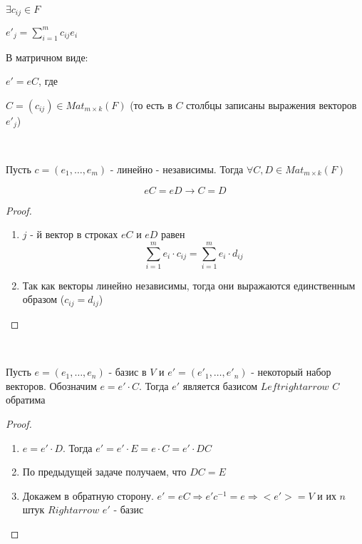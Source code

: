 $\exists c_{ij} \in F$

$e'_j = \sum_{i = 1}^mc_{ij}e_i$

В матричном виде:

$e' = eC$, где

$C = (c_{ij}) \in Mat_{m \times k}(F)$ (то есть в $C$ столбцы записаны выражения векторов $e'_j$)


\bigskip


\begin{lemma}~
    
    Пусть $c = \left(e_1, \dots, e_m\right)$ - линейно - независимы. Тогда $\forall C, D \in Mat_{m \times k}(F)$

    $$eC = eD \rightarrow C = D$$

    \begin{proof}~
        
        \begin{enumerate}
            \item $j$ - й вектор в строках $eC$ и $eD$ равен 
            $$\sum_{i = 1}^{m}e_i \cdot c_{ij} = \sum_{i = 1}^{m}e_i \cdot d_{ij}$$
            \item Так как векторы линейно независимы, тогда они выражаются единственным образом ($c_{ij} = d_{ij}$)
        \end{enumerate}

    \end{proof}

\end{lemma}


\bigskip


\begin{problem}~
    
    Пусть $e = \left(e_1, \dots, e_n\right)$ - базис в $V$ и $e' = \left(e'_1, \dots, e'_n\right)$ - некоторый набор векторов. Обозначим $e = e' \cdot C$. Тогда $e'$ является базисом $Leftrightarrow$ $C$ обратима

    \begin{proof}~
        
        \begin{enumerate}
            \item $e = e' \cdot D$. Тогда $e' = e' \cdot E = e \cdot C = e' \cdot DC$
            \item По предыдущей задаче получаем, что $DC = E$
            \item Докажем в обратную сторону. $e' = eC \Rightarrow e'c^{-1} = e \Rightarrow <e'> = V$ и их $n$ штук $Rightarrow$ $e'$ - базис
        \end{enumerate}

    \end{proof}

\end{problem}


